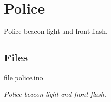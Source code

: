 \hypertarget{group__police}{}\section{Police}
\label{group__police}


Police beacon light and front flash.  


\subsection*{Files}
\begin{DoxyCompactItemize}
\item 
file \hyperlink{police_8ino}{police.\+ino}
\begin{DoxyCompactList}\small\item\em Police beacon light and front flash. \end{DoxyCompactList}\end{DoxyCompactItemize}
